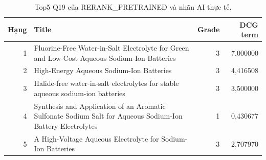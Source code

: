 \begin{table}[H]\centering\small\setlength{\tabcolsep}{4pt}\renewcommand{\arraystretch}{1.16}
\caption{Top5 Q19 của RERANK\_PRETRAINED và nhãn AI thực tế.}\label{tab:worked-example}
\begin{tabular}{rp{.59\linewidth}rr}
\toprule Hạng & Title & Grade & DCG term \\
\midrule
1 & Fluorine-Free Water-in-Salt Electrolyte for Green and Low-Cost Aqueous Sodium-Ion Batteries & 3 & 7,000000 \\
2 & High-Energy Aqueous Sodium-Ion Batteries & 3 & 4,416508 \\
3 & Halide-free water-in-salt electrolytes for stable aqueous sodium-ion batteries & 3 & 3,500000 \\
4 & Synthesis and Application of an Aromatic Sulfonate Sodium Salt for Aqueous Sodium-Ion Battery Electrolytes & 1 & 0,430677 \\
5 & A High-Voltage Aqueous Electrolyte for Sodium-Ion Batteries & 3 & 2,707970 \\
\bottomrule\end{tabular}
\end{table}
